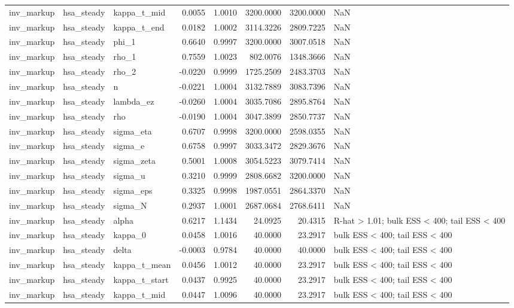 \begin{tabular}{lllrrrrl}
inv\_markup & hsa\_steady & kappa\_t\_mid & 0.0055 & 1.0010 & 3200.0000 & 3200.0000 & NaN \\
inv\_markup & hsa\_steady & kappa\_t\_end & 0.0182 & 1.0002 & 3114.3226 & 2809.7225 & NaN \\
inv\_markup & hsa\_steady & phi\_1 & 0.6640 & 0.9997 & 3200.0000 & 3007.0518 & NaN \\
inv\_markup & hsa\_steady & rho\_1 & 0.7559 & 1.0023 & 802.0076 & 1348.3666 & NaN \\
inv\_markup & hsa\_steady & rho\_2 & -0.0220 & 0.9999 & 1725.2509 & 2483.3703 & NaN \\
inv\_markup & hsa\_steady & n & -0.0221 & 1.0004 & 3132.7889 & 3083.7396 & NaN \\
inv\_markup & hsa\_steady & lambda\_ez & -0.0260 & 1.0004 & 3035.7086 & 2895.8764 & NaN \\
inv\_markup & hsa\_steady & rho & -0.0190 & 1.0004 & 3047.3899 & 2850.7737 & NaN \\
inv\_markup & hsa\_steady & sigma\_eta & 0.6707 & 0.9998 & 3200.0000 & 2598.0355 & NaN \\
inv\_markup & hsa\_steady & sigma\_e & 0.6758 & 0.9997 & 3033.3472 & 2829.3676 & NaN \\
inv\_markup & hsa\_steady & sigma\_zeta & 0.5001 & 1.0008 & 3054.5223 & 3079.7414 & NaN \\
inv\_markup & hsa\_steady & sigma\_u & 0.3210 & 0.9999 & 2808.6682 & 3200.0000 & NaN \\
inv\_markup & hsa\_steady & sigma\_eps & 0.3325 & 0.9998 & 1987.0551 & 2864.3370 & NaN \\
inv\_markup & hsa\_steady & sigma\_N & 0.2937 & 1.0001 & 2687.0684 & 2768.6411 & NaN \\
inv\_markup & hsa\_steady & alpha & 0.6217 & 1.1434 & 24.0925 & 20.4315 & R-hat > 1.01; bulk ESS < 400; tail ESS < 400 \\
inv\_markup & hsa\_steady & kappa\_0 & 0.0458 & 1.0016 & 40.0000 & 23.2917 & bulk ESS < 400; tail ESS < 400 \\
inv\_markup & hsa\_steady & delta & -0.0003 & 0.9784 & 40.0000 & 40.0000 & bulk ESS < 400; tail ESS < 400 \\
inv\_markup & hsa\_steady & kappa\_t\_mean & 0.0456 & 1.0012 & 40.0000 & 23.2917 & bulk ESS < 400; tail ESS < 400 \\
inv\_markup & hsa\_steady & kappa\_t\_start & 0.0437 & 0.9925 & 40.0000 & 23.2917 & bulk ESS < 400; tail ESS < 400 \\
inv\_markup & hsa\_steady & kappa\_t\_mid & 0.0447 & 1.0096 & 40.0000 & 23.2917 & bulk ESS < 400; tail ESS < 400 \\

\end{tabular}
